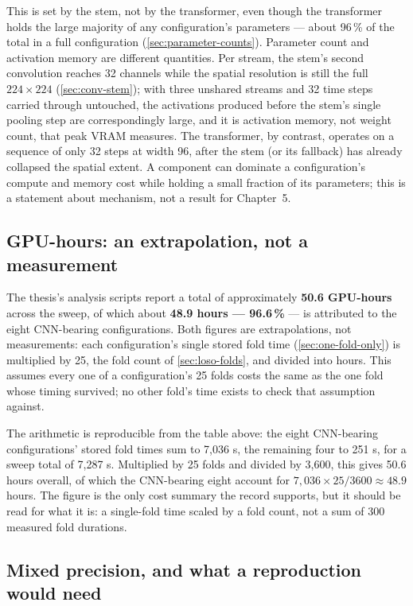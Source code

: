 This is set by the stem, not by the transformer, even though the transformer holds the large majority of any configuration's parameters --- about 96\,\% of the total in a full configuration (\autoref{sec:parameter-counts}). Parameter count and activation memory are different quantities. Per stream, the stem's second convolution reaches 32 channels while the spatial resolution is still the full $224 \times 224$ (\autoref{sec:conv-stem}); with three unshared streams and 32 time steps carried through untouched, the activations produced before the stem's single pooling step are correspondingly large, and it is activation memory, not weight count, that peak VRAM measures. The transformer, by contrast, operates on a sequence of only 32 steps at width 96, after the stem (or its fallback) has already collapsed the spatial extent. A component can dominate a configuration's compute and memory cost while holding a small fraction of its parameters; this is a statement about mechanism, not a result for Chapter~5.

\subsection{GPU-hours: an extrapolation, not a measurement}
\label{sec:gpu-hours}

The thesis's analysis scripts report a total of approximately \textbf{50.6 GPU-hours} across the sweep, of which about \textbf{48.9 hours --- 96.6\,\%} --- is attributed to the eight CNN-bearing configurations. Both figures are extrapolations, not measurements: each configuration's single stored fold time (\autoref{sec:one-fold-only}) is multiplied by 25, the fold count of \autoref{sec:loso-folds}, and divided into hours. This assumes every one of a configuration's 25 folds costs the same as the one fold whose timing survived; no other fold's time exists to check that assumption against.

The arithmetic is reproducible from the table above: the eight CNN-bearing configurations' stored fold times sum to 7,036 s, the remaining four to 251 s, for a sweep total of 7,287 s. Multiplied by 25 folds and divided by 3,600, this gives 50.6 hours overall, of which the CNN-bearing eight account for $7{,}036 \times 25 / 3600 \approx 48.9$ hours. The figure is the only cost summary the record supports, but it should be read for what it is: a single-fold time scaled by a fold count, not a sum of 300 measured fold durations.

\subsection{Mixed precision, and what a reproduction would need}
\label{sec:mixed-precision}

